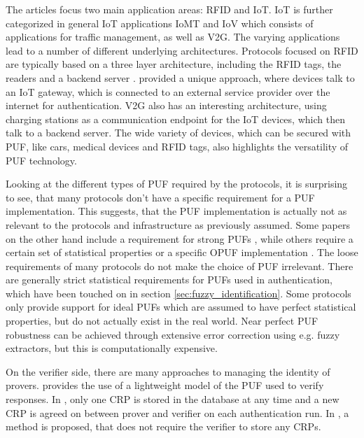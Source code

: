 The articles focus two main application areas: RFID and IoT. IoT is further categorized in general IoT applications
\ac{IoMT} and \ac{IoV} which consists of applications for traffic management, as well as \ac{V2G}.
The varying applications lead to a number of different underlying architectures.
Protocols focused on RFID are typically based on a three layer architecture, including the RFID tags, the readers and
a backend server \cite{Gope2018} \cite{Zhu2019}.
\cite{Gope2022} provided a unique approach, where devices talk to an IoT gateway, which is connected to an external service
provider over the internet for authentication.
\ac{V2G} also has an interesting architecture, using charging stations as a communication endpoint for the IoT devices,
which then talk to a backend server.
The wide variety of devices, which can be secured with PUF, like cars, medical devices and RFID tags, also highlights the
versatility of PUF technology.

Looking at the different types of PUF required by the protocols, it is surprising to see, that many protocols don't have
a specific requirement for a PUF implementation.
This suggests, that the PUF implementation is actually not as relevant to the protocols and infrastructure as previously assumed.
Some papers on the other hand include a requirement for strong PUFs \cite{Gope2018} \cite{Zhu2019}, while others
require a certain set of statistical properties \cite{Majzoobi2012} or a specific \ac{OPUF} implementation \cite{Gope2022}.
The loose requirements of many protocols do not make the choice of PUF irrelevant. There are generally strict statistical requirements for
PUFs used in authentication, which have been touched on in section \ref{sec:fuzzy_identification}.
Some protocols only provide support for ideal PUFs which are assumed to have perfect statistical properties,
but do not actually exist in the real world. Near perfect PUF robustness can be achieved through extensive
error correction using e.g. fuzzy extractors, but this is computationally expensive. \cite{Dodis2004}

On the verifier side, there are many approaches to managing the identity of provers.
\cite{Majzoobi2012} provides the use of a lightweight model of the PUF used to verify
responses. In \cite{Zhu2019}, only one \ac{CRP} is stored in the database at any time and a new
\ac{CRP} is agreed on between prover and verifier on each authentication run.
In \cite{Chatterjee2019}, a method is proposed, that does not require the verifier to store any CRPs.

